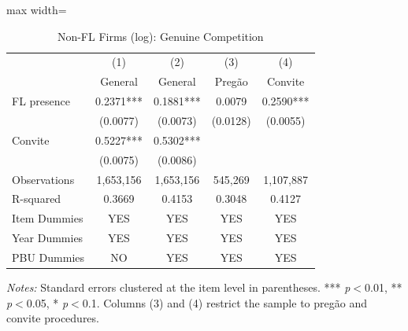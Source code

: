 \begin{table}[htbp]
\centering
\caption{Non-FL Firms (log): Genuine Competition}
\label{tab:nfirms_excl}
\begin{adjustbox}{max width=\textwidth}
\begin{threeparttable}
\small
\begin{tabular}{lcccc}
\toprule
 & (1) & (2) & (3) & (4) \\
 & General & General & Preg\~{a}o & Convite \\
\midrule
FL presence & 0.2371*** & 0.1881*** & 0.0079 & 0.2590*** \\
 & (0.0077) & (0.0073) & (0.0128) & (0.0055) \\
Convite & 0.5227*** & 0.5302*** &  &  \\
 & (0.0075) & (0.0086) &  &  \\
\midrule
Observations & 1,653,156 & 1,653,156 & 545,269 & 1,107,887 \\
R-squared & 0.3669 & 0.4153 & 0.3048 & 0.4127 \\
Item Dummies & YES & YES & YES & YES \\
Year Dummies & YES & YES & YES & YES \\
PBU Dummies & NO & YES & YES & YES \\
\bottomrule
\end{tabular}
\begin{tablenotes}
\small
\item \textit{Notes:} Standard errors clustered at the item level in parentheses. *** \textit{p}$<$0.01, ** \textit{p}$<$0.05, * \textit{p}$<$0.1. Columns (3) and (4) restrict the sample to preg\~{a}o and convite procedures.
\end{tablenotes}
\end{threeparttable}
\end{adjustbox}
\end{table}
